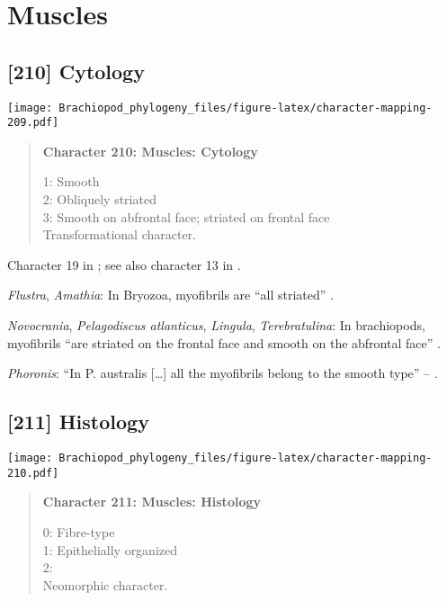 \documentclass[openany]{book}
\theoremstyle{definition}
\theoremstyle{definition}
\theoremstyle{definition}
\theoremstyle{remark}
\begin{document}
\section{Muscles}\label{muscles}

\subsection*{{[}210{]} Cytology}\label{cytology}

\texttt{[image: Brachiopod\_phylogeny\_files/figure-latex/character-mapping-209.pdf]}

\begin{quote}
\textbf{Character 210: Muscles: Cytology}

1: Smooth\\
2: Obliquely striated\\
3: Smooth on abfrontal face; striated on frontal face\\
Transformational character.
\end{quote}

Character 19 in \citet{Haszprunar1996}; see also character 13 in
\citet{Haszprunar2000}.

\hypertarget{Amathia-coding-210}{}
\emph{Flustra}, \emph{Amathia}: In Bryozoa, myofibrils are ``all
striated'' \citep{Pardos1991}.

\hypertarget{Lingula-coding-210}{}
\emph{Novocrania}, \emph{Pelagodiscus atlanticus}, \emph{Lingula},
\emph{Terebratulina}: In brachiopods, myofibrils ``are striated on the
frontal face and smooth on the abfrontal face'' \citep{Pardos1991}.

\hypertarget{Phoronis-coding-210}{}
\emph{Phoronis}: ``In P. australis {[}\ldots{}{]} all the myofibrils
belong to the smooth type'' -- \citet{Pardos1991}.

\subsection*{{[}211{]} Histology}\label{histology}

\texttt{[image: Brachiopod\_phylogeny\_files/figure-latex/character-mapping-210.pdf]}

\begin{quote}
\textbf{Character 211: Muscles: Histology}

0: Fibre-type\\
1: Epithelially organized\\
2:\\
Neomorphic character.
\end{quote}
\end{document}
